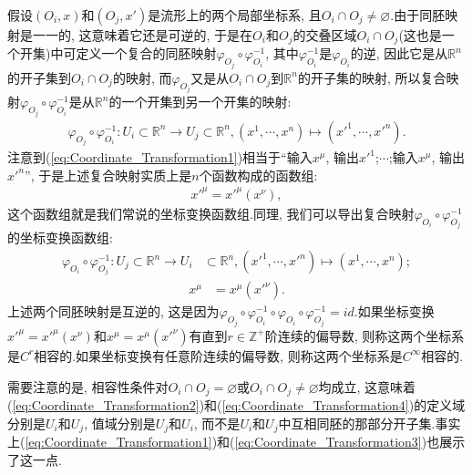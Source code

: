 假设$(O_i,x)$和$(O_j,x')$是流形上的两个局部坐标系, 且$O_i\cap O_j\neq \varnothing$.由于同胚映射是一一的, 这意味着它还是可逆的, 于是在$O_i$和$O_j$的交叠区域$O_i\cap O_j$(这也是一个开集)中可定义一个复合的同胚映射$\varphi_{O_j}\circ \varphi^{-1}_{O_i}$, 其中$\varphi^{-1}_{O_i}$是$\varphi_{O_i}$的逆, 因此它是从$\mathbb{R}^n$的开子集到$O_i\cap O_j$的映射, 而$\varphi_{O_j}$又是从$O_i\cap O_j$到$\mathbb{R}^n$的开子集的映射, 所以复合映射$\varphi_{O_j}\circ \varphi^{-1}_{O_i}$是从$\mathbb{R}^n$的一个开集到另一个开集的映射:
\begin{equation}\label{eq:Coordinate_Transformation1}
  \begin{split}
    \varphi_{O_j}\circ \varphi^{-1}_{O_i}:U_i\subset\mathbb{R}^n\rightarrow U_j\subset\mathbb{R}^n,(x^1,\cdots,x^n)\mapsto (x'^1,\cdots,x'^n).
  \end{split}
\end{equation}
注意到(\ref{eq:Coordinate_Transformation1})相当于“输入$x^\mu$, 输出$x'^1$;$\cdots$;输入$x^\mu$, 输出$x'^n$”, 于是上述复合映射实质上是$n$个函数构成的函数组:
\begin{equation}\label{eq:Coordinate_Transformation2}
  \begin{split}
    x'^\mu=x'^\mu(x^\nu),
  \end{split}
\end{equation}
这个函数组就是我们常说的坐标变换函数组.同理, 我们可以导出复合映射$\varphi_{O_i}\circ \varphi^{-1}_{O_j}$的坐标变换函数组:
\begin{equation}\label{eq:Coordinate_Transformation3}
  \begin{split}
    \varphi_{O_i}\circ \varphi^{-1}_{O_j}:U_j\subset\mathbb{R}^n\rightarrow U_i&\subset\mathbb{R}^n,(x'^1,\cdots,x'^n)\mapsto (x^1,\cdots,x^n);
  \end{split}
\end{equation}
\begin{equation}\label{eq:Coordinate_Transformation4}
  \begin{split}
    x^\mu&=x^\mu(x'^\nu).
  \end{split}
\end{equation}
上述两个同胚映射是互逆的, 这是因为$\varphi_{O_j}\circ \varphi^{-1}_{O_i}\circ \varphi_{O_i}\circ \varphi^{-1}_{O_j}=id$.如果坐标变换$x'^\mu=x'^\mu(x^\nu)$和$x^\mu=x^\mu(x'^\nu)$有直到$r\in\mathbb{Z}^+$阶连续的偏导数, 则称这两个坐标系是$C^r$相容的.如果坐标变换有任意阶连续的偏导数, 则称这两个坐标系是$C^\infty$相容的.
\begin{remark}
  需要注意的是, 相容性条件对$O_i\cap O_j=\varnothing$或$O_i\cap O_j\neq \varnothing$均成立, 这意味着(\ref{eq:Coordinate_Transformation2})和(\ref{eq:Coordinate_Transformation4})的定义域分别是$U_i$和$U_j$, 值域分别是$U_j$和$U_i$, 而不是$U_i$和$U_j$中互相同胚的那部分开子集.事实上(\ref{eq:Coordinate_Transformation1})和(\ref{eq:Coordinate_Transformation3})也展示了这一点.
\end{remark}

